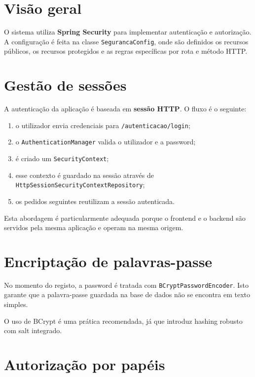 \documentclass[10pt,a4paper]{report}
\begin{document}
\section{Visão geral}

O sistema utiliza \textbf{Spring Security} para implementar autenticação e autorização. A configuração é feita na classe \texttt{SegurancaConfig}, onde são definidos os recursos públicos, os recursos protegidos e as regras específicas por rota e método \ac{HTTP}.

\section{Gestão de sessões}

A autenticação da aplicação é baseada em \textbf{sessão \ac{HTTP}}. O fluxo é o seguinte:

\begin{enumerate}
    \item o utilizador envia credenciais para \texttt{/autenticacao/login};
    \item o \texttt{AuthenticationManager} valida o utilizador e a password;
    \item é criado um \texttt{SecurityContext};
    \item esse contexto é guardado na sessão através de \texttt{HttpSessionSecurityContextRepository};
    \item os pedidos seguintes reutilizam a sessão autenticada.
\end{enumerate}

Esta abordagem é particularmente adequada porque o frontend e o backend são servidos pela mesma aplicação e operam na mesma origem.

\section{Encriptação de palavras-passe}

No momento do registo, a password é tratada com \texttt{BCryptPasswordEncoder}. Isto garante que a palavra-passe guardada na base de dados não se encontra em texto simples.

O uso de BCrypt é uma prática recomendada, já que introduz hashing robusto com salt integrado.

\section{Autorização por papéis}
\end{document}

